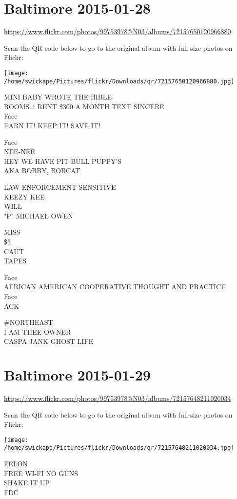 \documentclass[10pt,letterpaper]{article}
\begin{document}
\section*{Baltimore 2015-01-28}

\url{https://www.flickr.com/photos/99753978@N03/albums/72157650120966880}

Scan the QR code below to go to the original album with full-size photos on Flickr:

\texttt{[image: /home/swickape/Pictures/flickr/Downloads/qr/72157650120966880.jpg]}


MINI BABY WROTE THE BIBLE\\
ROOMS 4 RENT \$300 A MONTH TEXT SINCERE\\
Face\\
EARN IT!  KEEP IT!  SAVE IT!

Face\\
NEE{-}NEE\\
HEY WE HAVE PIT BULL PUPPY'S\\
AKA BOBBY, BOBCAT

LAW ENFORCEMENT SENSITIVE\\
KEEZY KEE\\
WILL\\
"P" MICHAEL OWEN

MISS\\
\$5\\
CAUT\\
TAPES

Face\\
AFRICAN AMERICAN COOPERATIVE THOUGHT AND PRACTICE\\
Face\\
ACK

\#NORTHEAST\\
I AM THEE OWNER\\
CASPA JANK GHOST LIFE


\section*{Baltimore 2015-01-29}

\url{https://www.flickr.com/photos/99753978@N03/albums/72157648211020034}

Scan the QR code below to go to the original album with full-size photos on Flickr:

\texttt{[image: /home/swickape/Pictures/flickr/Downloads/qr/72157648211020034.jpg]}


FELON\\
FREE WI{-}FI NO GUNS\\
SHAKE IT UP\\
FDC
\end{document}
